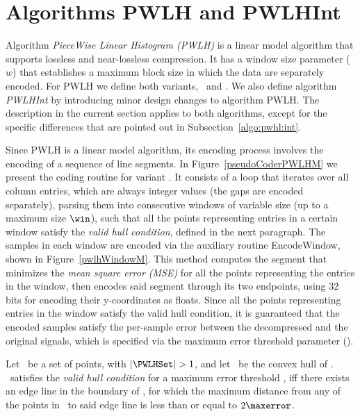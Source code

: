 

\section{Algorithms PWLH and PWLHInt}
\label{algo:pwlh}
\newcommand{\EncodeWindow}{EncodeWindow}


Algorithm \textit{PieceWise Linear Histogram (PWLH)} \cite{coder:pwlh} is a linear model algorithm that supports lossless and near-lossless compression. It has a window size parameter ($w$) that establishes a maximum block size in which the data are separately encoded. For PWLH we define both variants, \maskalgo\ and \NOmaskalgo. We also define algorithm \textit{PWLHInt} by introducing minor design changes to algorithm PWLH. The description in the current section applies to both algorithms, except for the specific differences that are pointed out in Subsection~\ref{algo:pwhl:int}.


Since PWLH is a linear model algorithm, its encoding process involves the encoding of a sequence of line segments. In Figure~\ref{pseudoCoderPWLHM} we present the coding routine for variant \maskalgo. It consists of a loop that iterates over all column entries, which are always integer values (the gaps are encoded separately), parsing them into consecutive windows of variable size (up to a maximum size $\win$), such that all the points representing entries in a certain window satisfy the \textit{valid hull condition}, defined in the next paragraph. The samples in each window are encoded via the auxiliary routine \EncodeWindow, shown in Figure~\ref{pwlhWindowM}. This method computes the segment that minimizes the \textit{mean square error (MSE)} for all the points representing the entries in the window, then encodes said segment through its two endpoints, using 32 bits for encoding their y-coordinates as floats. Since all the points representing entries in the window satisfy the valid hull condition, it is guaranteed that the encoded samples satisfy the per-sample error between the decompressed and the original signals, which is specified via the maximum error threshold parameter (\maxerror).

\clearpage








\vspace{+5pt}
\begin{defcion}
\label{def:validHull}
Let \PWLHSet\ be a set of points, with $|\PWLHSet|>1$, and let \hull\ be the convex hull of \PWLHSet. \hull\ satisfies the \textit{valid hull condition} for a maximum error threshold \maxerror, iff there exists an edge line in the boundary of \hull, for which the maximum distance from any of the points in \hull\ to said edge line is less than or equal to $2\maxerror$.
\end{defcion}


